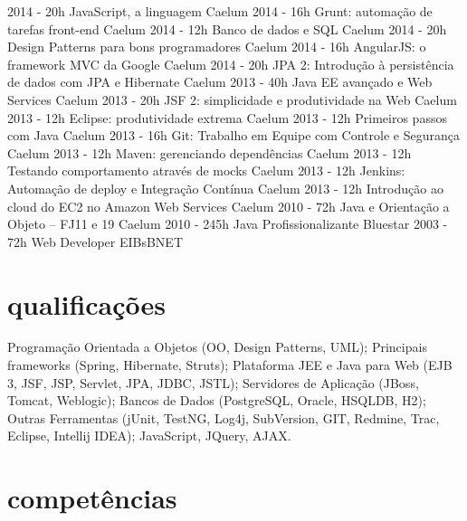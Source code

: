 \begin{entrylistii}
  \entryii
    {2014 - 20h}
    {JavaScript, a linguagem}
    {Caelum}  
  \entryii
    {2014 - 16h}
    {Grunt: automação de tarefas front-end}
    {Caelum}  
  \entryii
    {2014 - 12h}
    {Banco de dados e SQL}
    {Caelum}  
  \entryii
    {2014 - 20h}
    {Design Patterns para bons programadores}
    {Caelum}  
  \entryii
    {2014 - 16h}
    {AngularJS: o framework MVC da Google}
    {Caelum}
  \entryii
    {2014 - 20h}
    {JPA 2: Introdução à persistência de dados com JPA e Hibernate}
    {Caelum}
  \entryii
    {2013 - 40h}
    {Java EE avançado e Web Services}
    {Caelum}
  \entryii
    {2013 - 20h}
    {JSF 2: simplicidade e produtividade na Web}
    {Caelum}
  \entryii
    {2013 - 12h}
    {Eclipse: produtividade extrema}
    {Caelum}
  \entryii
    {2013 - 12h}
    {Primeiros passos com Java}
    {Caelum}
  \entryii
    {2013 - 16h}
    {Git: Trabalho em Equipe com Controle e Segurança}
    {Caelum}
  \entryii
    {2013 - 12h}
    {Maven: gerenciando dependências}
    {Caelum}
  \entryii
    {2013 - 12h}
    {Testando comportamento através de mocks}
    {Caelum}
  \entryii
    {2013 - 12h}
    {Jenkins: Automação de deploy e Integração Contínua}
    {Caelum}
  \entryii
    {2013 - 12h}
    {Introdução ao cloud do EC2 no Amazon Web Services}
    {Caelum}
  \entryii
    {2010 - 72h}
    {Java e Orientação a Objeto – FJ11 e 19}
    {Caelum}
  \entryii
    {2010 - 245h}
    {Java Profissionalizante}
    {Bluestar}
  \entryii
    {2003 - 72h}
    {Web Developer}
    {EIBsBNET}
\end{entrylistii}

\newpage

\section{qualificações}

Programação Orientada a Objetos (OO, Design Patterns, UML); Principais frameworks (Spring, Hibernate, Struts); Plataforma JEE e Java para Web (EJB 3, JSF, JSP, Servlet, JPA, JDBC, JSTL); Servidores de Aplicação (JBoss, Tomcat, Weblogic); Bancos de Dados (PostgreSQL, Oracle, HSQLDB, H2); Outras Ferramentas (jUnit, TestNG, Log4j, SubVersion, GIT, Redmine, Trac, Eclipse, Intellij IDEA); JavaScript, JQuery, AJAX.

\section{competências}

